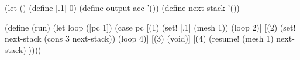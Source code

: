 \begin{CodeBlock}
(let ()
  (define |.1| 0)
  (define output-acc '())
  (define next-stack '())

  (define (run)
    (let loop ([pc 1])
      (case pc
        [(1) (set! |.1| (mesh 1)) (loop 2)]
        [(2) (set! next-stack (cons 3 next-stack))
             (loop 4)]
        [(3) (void)]
        [(4) (resume! (mesh 1) next-stack)]))))
\end{CodeBlock}
